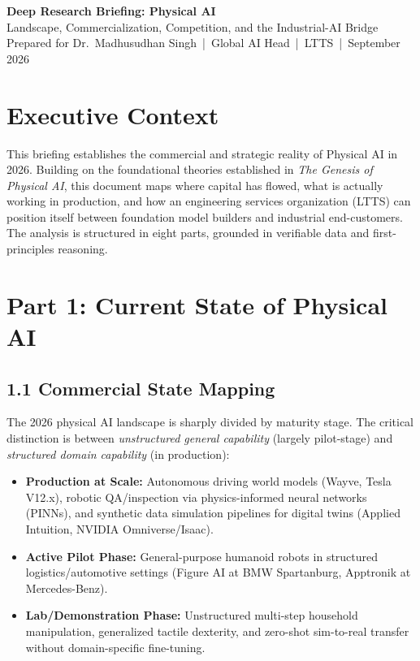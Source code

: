 \documentclass[11pt,a4paper]{article}
\begin{document}
\begin{center}
{\LARGE\bfseries\color{darkprimary} Deep Research Briefing: Physical AI}\\[5pt]
{\large\color{textgray} Landscape, Commercialization, Competition, and the Industrial-AI Bridge}\\[3pt]
{\small\color{textgray} Prepared for Dr.\ Madhusudhan Singh \,|\, Global AI Head \,|\, LTTS \,|\, September 2026}
\end{center}

\vspace{0.2cm}

\section*{Executive Context}
This briefing establishes the commercial and strategic reality of Physical AI in 2026. Building on the foundational theories established in \textit{The Genesis of Physical AI}, this document maps where capital has flowed, what is actually working in production, and how an engineering services organization (LTTS) can position itself between foundation model builders and industrial end-customers. The analysis is structured in eight parts, grounded in verifiable data and first-principles reasoning.

\section{Part 1: Current State of Physical AI}

\subsection{1.1 Commercial State Mapping}
The 2026 physical AI landscape is sharply divided by maturity stage. The critical distinction is between \textit{unstructured general capability} (largely pilot-stage) and \textit{structured domain capability} (in production):
\begin{itemize}
    \item \textbf{Production at Scale:} Autonomous driving world models (Wayve, Tesla V12.x), robotic QA/inspection via physics-informed neural networks (PINNs), and synthetic data simulation pipelines for digital twins (Applied Intuition, NVIDIA Omniverse/Isaac).
    \item \textbf{Active Pilot Phase:} General-purpose humanoid robots in structured logistics/automotive settings (Figure AI at BMW Spartanburg, Apptronik at Mercedes-Benz).
    \item \textbf{Lab/Demonstration Phase:} Unstructured multi-step household manipulation, generalized tactile dexterity, and zero-shot sim-to-real transfer without domain-specific fine-tuning.
\end{itemize}
\end{document}

